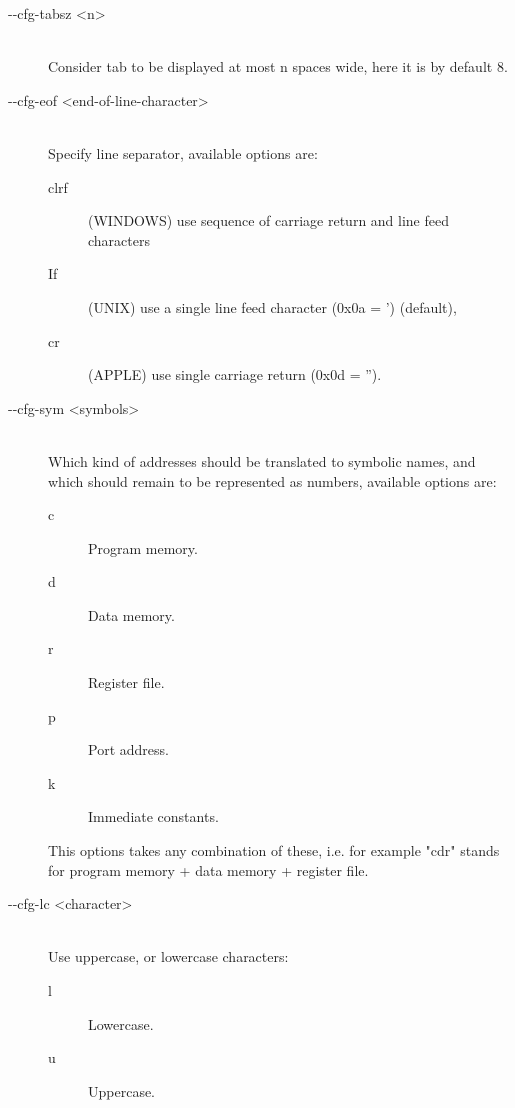 \begin{description}
            \item[-{}-cfg-tabsz <n>]~\\
                Consider tab to be displayed at most n spaces wide, here it is by default 8.

            \item[-{}-cfg-eof <end-of-line-character>]~\\
                Specify line separator, available options are:
                \begin{description}
                    \item [clrf] (WINDOWS) use sequence of carriage return and line feed characters
                    \item [If] (UNIX) use a single line feed character (0x0a = ') (default),
                    \item [cr] (APPLE) use single carriage return (0x0d = '').
                \end{description}

            \item[-{}-cfg-sym <symbols>]~\\
                Which kind of addresses should be translated to symbolic names, and which should remain to be represented as numbers, available options are:
                \begin{description}
                    \item [c] Program memory.
                    \item [d] Data memory.
                    \item [r] Register file.
                    \item [p] Port address.
                    \item [k] Immediate constants.
                \end{description}
                This options takes any combination of these, i.e. for example "cdr" stands for program memory + data memory + register file.

            \item[-{}-cfg-lc <character>]~\\
                Use uppercase, or lowercase characters:
                \begin{description}
                    \item [l] Lowercase.
                    \item [u] Uppercase.
                \end{description}


\end{description}
